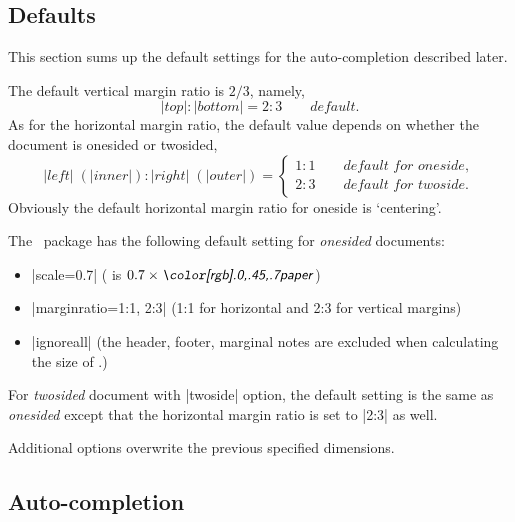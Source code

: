 \begin{paracol}{2}

 \subsection{Defaults}\label{sec:defaults}

 This section sums up the default settings for the auto-completion
 described later.
 
 The default vertical margin ratio is $2/3$, namely,
 \begin{equation}
  |top| : |bottom| = 2 : 3 \qquad\textit{default}.
 \end{equation}
 As for the horizontal margin ratio, the default value depends on
 whether the document is onesided or twosided,
 \begin{equation}
  |left|\;(|inner|) : |right|\;(|outer|) 
       = \left\{ \begin{array}{ll}
              1 : 1 \qquad\textit{default for oneside},\\
              2 : 3 \qquad\textit{default for twoside}.
         \end{array}\right.
 \end{equation}
 Obviously the default horizontal margin ratio for oneside is `centering'.

 The \Gm\ package has the following default setting for
 \textit{onesided} documents:
 \begin{itemize}\setlength{\itemsep}{-.5\parsep}
  \item |scale=0.7| ( is $0.7 \times \gpart{paper}$)
  \item |marginratio={1:1, 2:3}| (1:1 for horizontal and 2:3 for vertical margins)
  \item |ignoreall| (the header, footer, marginal notes are excluded
  when calculating the size of .)
\end{itemize}
 For \textit{twosided} document with |twoside| option, the default
 setting is the same as \textit{onesided} except that the horizontal
 margin ratio is set to |2:3| as well.

 Additional options overwrite the previous specified dimensions. 

\end{paracol}



 \subsection{Auto-completion} \label{sec:rules}

